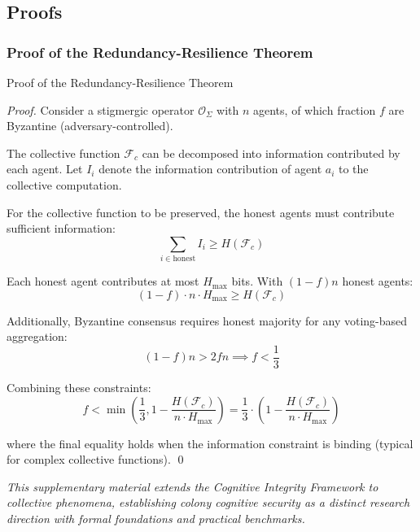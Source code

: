 \documentclass[
  ignorenonframetext,
]{beamer}
\begin{document}
\begin{frame}
\end{frame}

\subsection{Proofs}\label{sec:eusocial-proofs}

\subsubsection{Proof of the Redundancy-Resilience
Theorem}\label{sec:proof-redundancy-resilience}

\begin{frame}[allowframebreaks]{Proof of the Redundancy-Resilience
Theorem}
\begin{proof}
Consider a stigmergic operator $\mathcal{O}_\Sigma$ with $n$ agents, of which fraction $f$ are Byzantine (adversary-controlled).

The collective function $\mathcal{F}_c$ can be decomposed into information contributed by each agent. Let $I_i$ denote the information contribution of agent $a_i$ to the collective computation.

For the collective function to be preserved, the honest agents must contribute sufficient information:
\begin{equation}
\sum_{i \in \text{honest}} I_i \geq H(\mathcal{F}_c)
\label{eq:honest-info-sufficiency}
\end{equation}

Each honest agent contributes at most $H_{\max}$ bits. With $(1-f)n$ honest agents:
\begin{equation}
(1-f) \cdot n \cdot H_{\max} \geq H(\mathcal{F}_c)
\label{eq:honest-agent-capacity}
\end{equation}

Additionally, Byzantine consensus requires honest majority for any voting-based aggregation:
\begin{equation}
(1-f)n > 2fn \implies f < \frac{1}{3}
\label{eq:byzantine-honest-majority}
\end{equation}

Combining these constraints:
\begin{equation}
f < \min\left(\frac{1}{3}, 1 - \frac{H(\mathcal{F}_c)}{n \cdot H_{\max}}\right) = \frac{1}{3} \cdot \left(1 - \frac{H(\mathcal{F}_c)}{n \cdot H_{\max}}\right)
\label{eq:byzantine-info-combined}
\end{equation}

where the final equality holds when the information constraint is binding (typical for complex collective functions). \qed
\end{proof}
\end{frame}

\begin{frame}
\emph{This supplementary material extends the Cognitive Integrity
Framework to collective phenomena, establishing colony cognitive
security as a distinct research direction with formal foundations and
practical benchmarks.}
\end{frame}
\end{document}
